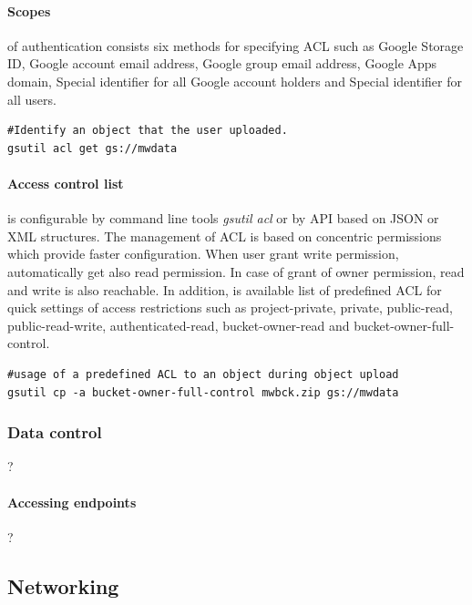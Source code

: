 \documentclass[a4paper,12pt,oneside]{report}
\begin{document}
\paragraph{Scopes}\label{par:scopes}of authentication consists six methods for 
specifying ACL such as  Google Storage ID, Google account email address, Google 
group email address, Google Apps domain, Special identifier for all Google 
account holders and Special identifier for all users.

\begin{footnotesize}
\begin{lstlisting}[style=mybash]
#Identify an object that the user uploaded.
gsutil acl get gs://mwdata
\end{lstlisting}\end{footnotesize}
 

\paragraph{Access control list} is configurable by command line tools \textit{gsutil acl} 
or by API based on JSON or XML structures. The management of ACL is based on concentric 
permissions which provide faster configuration. When user grant 
write permission, automatically get also read permission. In case of grant of owner 
permission, read and write is also reachable. In addition, is available 
list of predefined ACL for quick settings of access restrictions such as project-private, 
private, public-read, public-read-write, authenticated-read, 
bucket-owner-read and bucket-owner-full-control.

\begin{footnotesize}
\begin{lstlisting}[style=mybash]
#usage of a predefined ACL to an object during object upload
gsutil cp -a bucket-owner-full-control mwbck.zip gs://mwdata
\end{lstlisting}
\end{footnotesize}
 


\subsubsection{Data control}
?

\paragraph{Accessing endpoints}
?

		\subsection{Networking}
\end{document}
